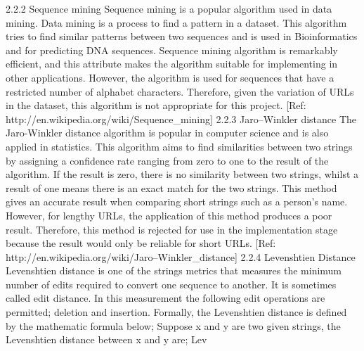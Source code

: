 2.2.2 Sequence mining
Sequence mining is a popular algorithm used in data mining. Data mining is a process to find a pattern in a dataset. This algorithm tries to find similar patterns between two sequences and is used in Bioinformatics and for predicting DNA sequences. Sequence mining algorithm is remarkably efficient, and this attribute makes the algorithm suitable for implementing in other applications. However, the algorithm is used for sequences that have a restricted number of alphabet characters. Therefore, given the variation of URLs in the dataset, this algorithm is not appropriate for this project.  
[Ref: http://en.wikipedia.org/wiki/Sequence_mining]
2.2.3 Jaro–Winkler distance
The Jaro-Winkler distance algorithm is popular in computer science and is also applied in statistics. This algorithm aims to find similarities between two strings by assigning a confidence rate ranging from zero to one to the result of the algorithm. If the result is zero, there is no similarity between two strings, whilst a result of one means there is an exact match for the two strings. This method gives an accurate result when comparing short strings such as a person’s name. However, for lengthy URLs, the application of this method produces a poor result. Therefore, this method is rejected for use in the implementation stage because the result would only be reliable for short URLs. 
[Ref: http://en.wikipedia.org/wiki/Jaro–Winkler_distance]
	2.2.4 Levenshtien Distance
Levenshtien distance is one of the strings metrics that measures the minimum number of edits required to convert one sequence to another. It is sometimes called edit distance. In this measurement the following edit operations are permitted; deletion and insertion. 
Formally, the Levenshtien distance is defined by the mathematic formula below;
Suppose x and y are two given strings, the Levenshtien distance between x and y are;
Lev


